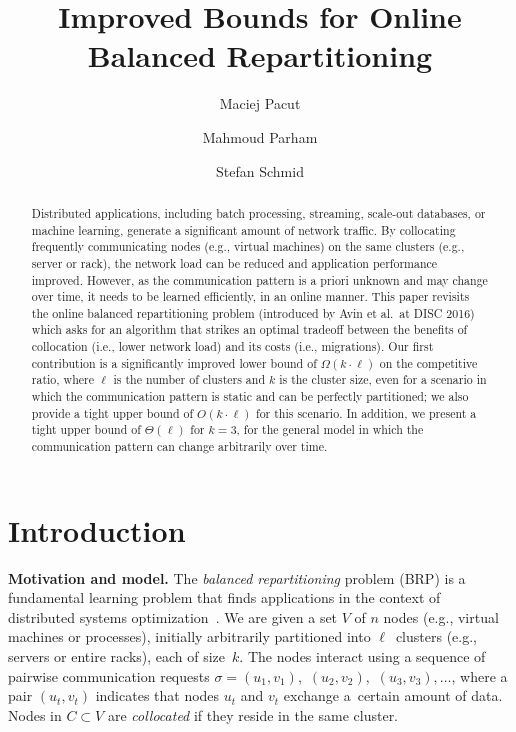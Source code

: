 \documentclass[manuscript,screen=true, review, anonymous]{acmart}
\title{Improved Bounds for Online Balanced Repartitioning}
\author{Maciej Pacut}
\affiliation{%
  \institution{Faculty of Computer Science, University of Vienna}
  \country{Austria}
}
\author{Mahmoud Parham}
\affiliation{%
  \institution{Faculty of Computer Science, University of Vienna}
  \country{Austria}
}
\author{Stefan Schmid}
\affiliation{%
  \institution{Faculty of Computer Science, University of Vienna}
  \country{Austria}
}
\newcommand{\OBRP}{BRP}
\begin{document}
\begin{abstract}
Distributed   applications,  including  batch  processing, streaming, scale-out databases,
or machine learning, generate a significant amount of network traffic. By collocating frequently communicating nodes (e.g., virtual machines) on the same clusters (e.g., server or rack), the network load can be reduced and application performance improved. 
However, as the communication pattern is a priori unknown and may change over time, it needs to be learned efficiently, in an online manner.
%
This paper revisits the online 
balanced repartitioning problem 
(introduced by Avin et al.~at DISC 2016)
which asks for an algorithm that strikes
an optimal tradeoff between the benefits
of collocation (i.e., lower network load) 
and its costs (i.e., migrations). 
%
Our first contribution is a significantly improved
lower bound of $\Omega(k\cdot \ell)$ on the
competitive ratio, where $\ell$ is the number
of clusters and $k$ is the cluster size,
even for a scenario in which the communication
pattern is static and can be perfectly partitioned;
we also provide a tight upper bound 
of $O(k\cdot \ell)$ for this scenario.
In addition, we present a tight upper bound
of $\Theta(\ell)$ for $k=3$,
for the general model in which the
communication pattern can change arbitrarily
over time. 
\end{abstract}
    
\maketitle
    
\renewcommand{\shortauthors}{M.~Pacut, M.~Parham, S.~Schmid}

\section{Introduction}

\noindent \textbf{Motivation and model.}
The \emph{balanced repartitioning} problem (\OBRP{})
is a fundamental learning problem
that finds applications in the context of
distributed systems optimization~\cite{repartition-disc}. We are given a set $V$ of $n$ nodes 
(e.g., virtual machines or processes),
initially arbitrarily partitioned into $\ell$~clusters
(e.g., servers or entire racks),
each of size~$k$.
The nodes interact using
a sequence of pairwise communication requests
$\sigma = (u_1,v_1),$ $(u_2,v_2),$ $(u_3,v_3), \ldots$,
where a pair $(u_t,v_t)$ indicates that nodes $u_t$ and $v_t$ exchange a~certain amount of data.
Nodes in $C \subset V$ are \emph{collocated}
if they reside in the same cluster.
\end{document}
